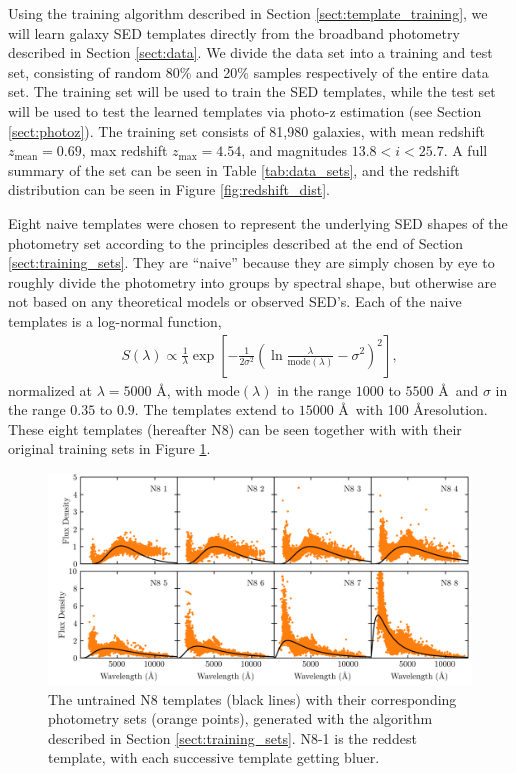 
\label{sect:application}

Using the training algorithm described in Section \ref{sect:template_training}, we will learn galaxy SED templates directly from the broadband photometry described in Section \ref{sect:data}.
We divide the data set into a training and test set, consisting of random 80\% and 20\% samples respectively of the entire data set.
The training set will be used to train the SED templates, while the test set will be used to test the learned templates via photo-z estimation (see Section \ref{sect:photoz}).
The training set consists of 81,980 galaxies, with mean redshift $z_\text{mean} = 0.69$, max redshift $z_\text{max} = 4.54$, and magnitudes $13.8 < i < 25.7$.
A full summary of the set can be seen in Table \ref{tab:data_sets}, and the redshift distribution can be seen in Figure \ref{fig:redshift_dist}.

Eight naive templates were chosen to represent the underlying SED shapes of the photometry set according to the principles described at the end of Section \ref{sect:training_sets}.
They are ``naive'' because they are simply chosen by eye to roughly divide the photometry into groups by spectral shape, but otherwise are not based on any theoretical models or observed SED's.
Each of the naive templates is a log-normal function,
\begin{align}
    S(\lambda) \propto \frac{1}{\lambda} \exp{\left[ -\frac{1}{2\sigma^2} \left( \ln{\frac{\lambda}{\text{mode}(\lambda)}}-\sigma^2 \right)^2 \right]},
\end{align}
normalized at $\lambda = 5000$ \AA, with $\text{mode}(\lambda)$ in the range $1000$ to $5500$ \AA\  and $\sigma$ in the range $0.35$ to $0.9$. 
The templates extend to $15000$ \AA\ with 100 \AA resolution.
These eight templates (hereafter N8) can be seen together with with their original training sets in Figure \ref{fig:N8_untrained}.

\begin{figure}
    \centering
    \includegraphics{figures/N8_untrained.png}
    \caption{The untrained N8 templates (black lines) with their corresponding photometry sets (orange points), generated with the algorithm described in Section \ref{sect:training_sets}. N8-1 is the reddest template, with each successive template getting bluer.}
    \label{fig:N8_untrained}
\end{figure}

